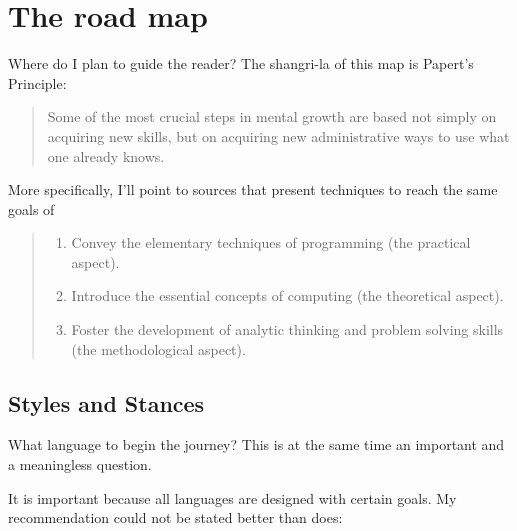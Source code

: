 \section{The road map} 

Where do I plan to guide the reader? The shangri-la of this map is 
Papert's Principle:

\begin{quotation}
Some of the most crucial steps in mental growth are based
not simply on acquiring new skills, but on acquiring new administrative ways to
use what one already knows. \cite{artificial_intelligence:minsky__society_of_mind}
\end{quotation}

More specifically, I'll point to sources that present techniques to reach the
same goals of \cite{education:keller__the_risks_and_benefits_of_teaching_purely_functional}

\begin{quote}
    \begin{enumerate}
    \item Convey the elementary techniques of programming (the practical aspect). 
    \item Introduce the essential concepts of computing (the theoretical aspect). 
    \item Foster the development of analytic thinking and problem solving skills (the methodological aspect).
    \end{enumerate}
\end{quote}

\subsection{Styles and Stances}

What language to begin the journey? This is at the same time an important and a
meaningless question. 

It is important because all languages are designed with certain goals. My
recommendation could not be stated better than
\cite{education:norvig__teach_yourself_programming} does:

